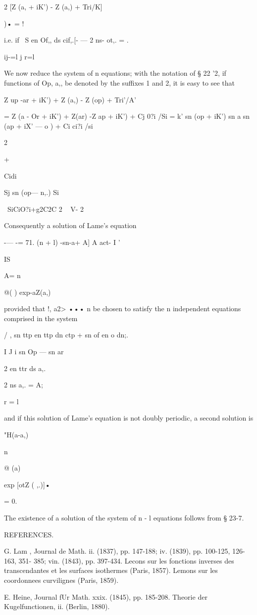 {{{{{{{{2 [Z (a, + iK') - Z (a,) + Tri/K]

)• = !

i.e. if \ S en Of,, ds cif,.[- — 2 ns- ot,. = .

ij-=l j r=l

We now reduce the system of n equations; with the notation of § 22
'2, if functions of Op, a,, be denoted by the suffixes 1 and 2, it is
easy to see that

Z up -ar + iK') + Z (a,) - Z (op) + Tri'/A'

= Z (a - Or + iK') + Z(ar) -Z ap + iK') + Cj 0?i /Si = k' sn (op +
iK') sn a sn (ap + iX' — o ) + Ci ci?i /si

 2

+

Cidi

Sj sn (op— n,.) Si

\ SiCiO?i+g2C2C 2 ~ V- 2

Consequently a solution of Lame's equation

-— -= 71. (n + l) -sn-a+ A] A act- I '

IS

A= n

@( ) exp-aZ(a,)

provided that !, a2> ••• n be chosen to satisfy the n independent
equations comprised in the system

/ , sn ttp en ttp dn ctp + sn of en o dn;. \

I J i sn Op — sn ar

2 en ttr ds a,.

2 ns a,. = A;

r = l

and if this solution of Lame's equation is not doubly periodic, a
second solution is

"H(a-a,)

n

@ (a)

exp [otZ ( ,.)]•

= 0.

The existence of a solution of the system of n - l equations follows
from § 23-7.

REFERENCES.

G. Lam , Journal de Math. ii. (1837), pp. 147-188; iv. (1839), pp.
100-125, 126-163, 351- 385; vin. (1843), pp. 397-434. Lecons sur les
fonctions inverses des transcendantes et les surfaces isothermes
(Paris, 1857). Lemons sur les coordonnees curvilignes (Paris, 1859).

E. Heine, Journal fUr Math. xxix. (1845), pp. 185-208. Theorie der
Kugelfunctionen, ii. (Berlin, 1880).

}}}}}}}}
